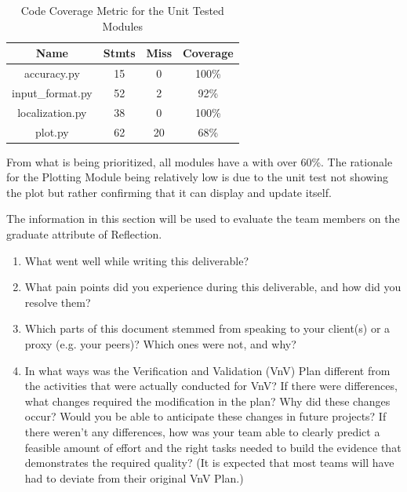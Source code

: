 \documentclass[12pt, titlepage]{article}
\begin{document}
\begin{table}[H]
  \begin{center}
  \begin{tabular}{ |c|c|c|c| }
  \hline
   \textbf{Name} &  \textbf{Stmts} &  \textbf{Miss} &  \textbf{Coverage}\\ 
  \hline
  
      accuracy.py & 15 & 0 & 100\% \\ 
      \hline
      input\_format.py & 52 & 2 & 92\% \\
      \hline
      localization.py & 38 & 0 & 100\% \\ 
      \hline
      plot.py & 62 & 20 & 68\% \\
  \hline
  \end{tabular}
  \caption{Code Coverage Metric for the Unit Tested Modules}
\label{tab:code-coverage-metrics}
\end{center}
\end{table}

From what is being prioritized, all modules have a with over 60\%. The rationale for the Plotting Module being relatively low is due to the unit test not showing the plot but rather confirming that it can display and update itself.


\newpage



\newpage{}

The information in this section will be used to evaluate the team members on the
graduate attribute of Reflection.

\begin{enumerate}
  \item What went well while writing this deliverable? 
  \item What pain points did you experience during this deliverable, and how
    did you resolve them?
  \item Which parts of this document stemmed from speaking to your client(s) or
  a proxy (e.g. your peers)? Which ones were not, and why?
  \item In what ways was the Verification and Validation (VnV) Plan different
  from the activities that were actually conducted for VnV?  If there were
  differences, what changes required the modification in the plan?  Why did
  these changes occur?  Would you be able to anticipate these changes in future
  projects?  If there weren't any differences, how was your team able to clearly
  predict a feasible amount of effort and the right tasks needed to build the
  evidence that demonstrates the required quality?  (It is expected that most
  teams will have had to deviate from their original VnV Plan.) \cite{Barfoot2017}
\end{enumerate}
\end{document}
